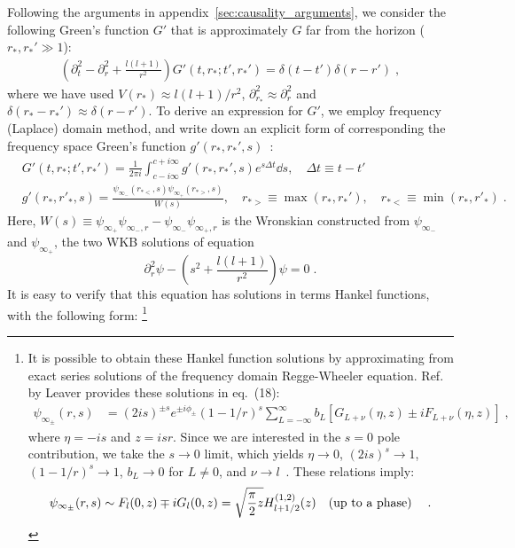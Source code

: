 \documentclass[reprint,aps,physrev,superscriptaddress,10pt,notitlepage,prd,nofootinbib,onecolumn]{revtex4-2}
\newcommand{\aref}[1]{appendix~\ref{#1}}
\begin{document}
Following the arguments in \aref{sec:causality_arguments}, we consider the following Green's function $G'$ that is approximately $G$ far from the horizon ($r_*, r_*' \gg 1$):
\begin{align}
  \left( \partial_t^2 - \partial_r^2 + \frac{l(l+1)}{r^2} \right) G'(t,r_*;t',r_*') =  \delta(t-t') \delta(r-r')  \;,
\end{align}
where we have used $V(r_*) \approx l(l+1)/r^2$, $\partial_{r_*}^2 \approx \partial_r^2$ and $\delta(r_*-r_*') \approx \delta(r-r')$.
To derive an expression for $G'$, we employ frequency (Laplace) domain method, and write down an explicit form of corresponding the frequency space Green's function $g'(r_*,r_*',s)$~\cite{Leaver:1986gd}:
\begin{align}\label{eq:G_prime_frequency_domain}
  &G'(t,r_*;t',r_*') = \frac{1}{2\pi i} \int_{c - i\infty}^{c + i\infty} g'(r_*, r_*',s) e^{s \Delta t} \dd{s},\quad  \Delta t \equiv t - t' \nonumber \\
  &g'(r_*, r'_*, s) = \frac{\psi_{\infty_-}(r_{*<}, s) \psi_{\infty_+}(r_{*>}, s)}{W(s)}, \quad    r_{*>} \equiv \max(r_*, r_*'), \quad r_{*<} \equiv \min(r_*, r'_*) \;.
\end{align}
Here, \( W(s) \equiv \psi_{\infty_+} \psi_{\infty_-,r} - \psi_{\infty_-} \psi_{\infty_+,r}\) is the Wronskian constructed from $\psi_{\infty_-}$ and $\psi_{\infty_+}$, the two WKB solutions of equation
\begin{equation}
  \partial_{r}^2 \psi - \left(s^2 + \frac{l(l+1)}{r^2}\right) \psi = 0 \;.
\end{equation}
It is easy to verify that this equation has solutions in terms Hankel functions, with the following form:
\footnote{It is possible to obtain these Hankel function solutions by approximating from exact series solutions of the frequency domain Regge-Wheeler equation. 
  Ref.~\cite{Leaver:1986gd} by Leaver provides these solutions in eq.~(18):
  \begin{align}
    \psi_{\infty_\pm}(r, s) &= (2is)^{\pm s} e^{\pm i \phi_\pm} (1 - 1/r)^s \sum_{L=-\infty}^{\infty} b_L [G_{L+\nu}(\eta,z) \pm i F_{L+\nu}(\eta,z)] \;,
  \end{align}
  where $\eta = -is$ and $z = i s r$.
  Since we are interested in the $s = 0$ pole contribution, we take the $s\to 0$ limit, which yields $\eta \to 0$, $(2is)^s \to 1$, $(1-1/r)^s \to 1$, $b_L \to 0$ for $L \neq 0$, and $\nu \to l$~\cite{Leaver:1986gd,Leaver:1986vnb}.
  These relations imply:
  \begin{align}
    \psi_{\infty_\pm}(r, s) \sim F_{l}(0,z) \mp i G_{l}(0,z) = \sqrt{\frac{\pi}{2} z} H_{l+1/2}^{(1,2)}(z)
    \qq{(up to a phase)} \;.
  \end{align}
}
\end{document}
